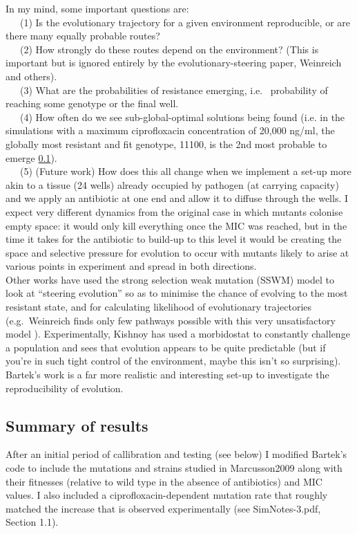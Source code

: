 \documentclass[a4paper,10pt]{article}
\begin{document}
In my mind, some important questions are:\\
~~~(1) Is the evolutionary trajectory for a given environment reproducible, or are there many equally probable routes?\\
~~~(2) How strongly do these routes depend on the environment? (This is important but is ignored entirely by the evolutionary-steering paper, Weinreich and others).\\
~~~(3) What are the probabilities of resistance emerging, i.e.~ probability of reaching some genotype or the final well. \\
~~~(4) How often do we see sub-global-optimal solutions being found (i.e. in the simulations with a maximum
ciprofloxacin concentration of 20,000 ng/ml, the globally most resistant and fit genotype, 11100, is the 2nd most probable to emerge \ref{}).\\
~~~(5) (Future work) How does this all change when we implement a set-up more akin to a tissue (24 wells) already occupied by pathogen (at carrying capacity) and we apply an antibiotic at one 
end and allow it to diffuse through the wells. I expect very different dynamics from the original case in which mutants colonise empty space: it would only kill everything once the MIC was 
reached, but in the time it takes for the antibiotic to build-up to this level it would be creating the space and selective pressure for evolution to occur with mutants 
likely to arise at various points in experiment and spread in both directions. \\

Other works have used the strong selection weak mutation (SSWM) model to look at “steering evolution” so as to minimise the chance of evolving to the most resistant state, and for calculating 
likelihood of evolutionary trajectories (e.g.~Weinreich finds only few pathways possible with this very unsatisfactory model \cite{}). 
Experimentally, Kishnoy has used a morbidostat \cite{} to constantly challenge a population and sees that evolution appears to be quite predictable 
(but if you're in such tight control of the environment, maybe this isn't so surprising). 
Bartek's work is a far more realistic and interesting set-up to investigate the reproducibility of evolution.\\




\subsection{Summary of results}
After an initial period of callibration and testing (see below) I modified Bartek's code to include the mutations and strains studied in Marcusson2009 \cite{} along with their fitnesses 
(relative to wild type in the absence of antibiotics) and MIC values. I also included a ciprofloxacin-dependent mutation rate that roughly
matched the increase that is observed experimentally (see SimNotes-3.pdf, Section 1.1). \\
\end{document}
